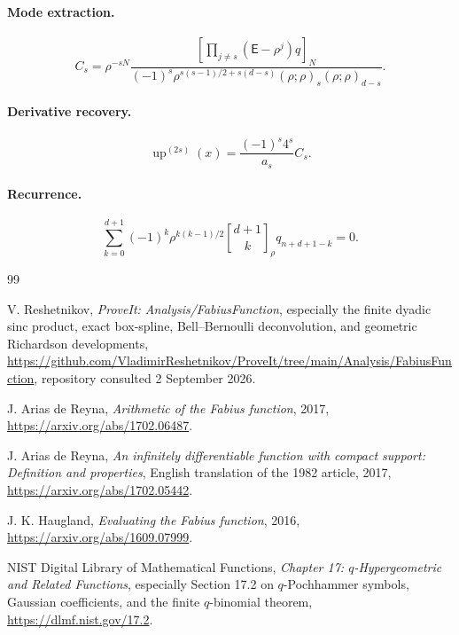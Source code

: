 \documentclass[11pt,oneside]{article}
\theoremstyle{definition}
\theoremstyle{remark}
\newcommand{\up}{\operatorname{up}}
\newcommand{\E}{\mathsf E}
\newcommand{\qbinom}[3]{\genfrac{[}{]}{0pt}{}{#1}{#2}_{#3}}
\begin{document}
\paragraph{Mode extraction.}
\[
 C_s=\rho^{-sN}
 \frac{\left[\prod_{j\ne s}(\E-\rho^j)q\right]_N}
 {(-1)^s\rho^{s(s-1)/2+s(d-s)}
  (\rho;\rho)_s(\rho;\rho)_{d-s}}.
\]

\paragraph{Derivative recovery.}
\[
 \up^{(2s)}(x)=\frac{(-1)^s4^s}{a_s}C_s.
\]

\paragraph{Recurrence.}
\[
 \sum_{k=0}^{d+1}(-1)^k\rho^{k(k-1)/2}
 \qbinom{d+1}{k}{\rho}q_{n+d+1-k}=0.
\]

\begin{thebibliography}{99}

V. Reshetnikov,
\emph{ProveIt: Analysis/FabiusFunction}, especially the finite dyadic sinc
product, exact box-spline, Bell--Bernoulli deconvolution, and geometric
Richardson developments,
\url{https://github.com/VladimirReshetnikov/ProveIt/tree/main/Analysis/FabiusFunction},
repository consulted 2 September 2026.

J. Arias de Reyna,
\emph{Arithmetic of the Fabius function},
2017,
\url{https://arxiv.org/abs/1702.06487}.

J. Arias de Reyna,
\emph{An infinitely differentiable function with compact support: Definition
and properties},
English translation of the 1982 article,
2017,
\url{https://arxiv.org/abs/1702.05442}.

J. K. Haugland,
\emph{Evaluating the Fabius function},
2016,
\url{https://arxiv.org/abs/1609.07999}.

NIST Digital Library of Mathematical Functions,
\emph{Chapter 17: \(q\)-Hypergeometric and Related Functions}, especially
Section 17.2 on \(q\)-Pochhammer symbols, Gaussian coefficients, and the
finite \(q\)-binomial theorem,
\url{https://dlmf.nist.gov/17.2}.

\end{thebibliography}
\end{document}
